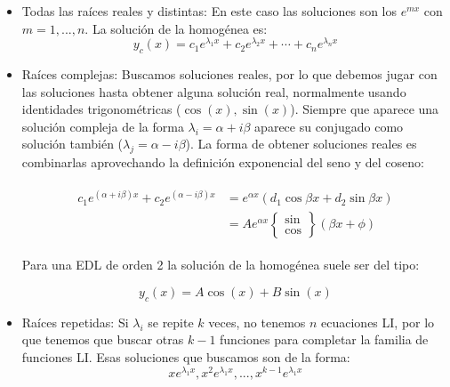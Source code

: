 \documentclass[a4paper,12pt,titlepage]{article}
\begin{document}
\begin{itemize}
    \item Todas las raíces reales y distintas: En este caso las soluciones son los $e^{mx}$ con $m=1,...,n$. La solución de la homogénea es:
    \begin{equation}
        y_c(x) = c_1e^{\lambda_1x} + c_2e^{\lambda_2 x} + \cdots + c_ne^{\lambda_nx}
    \end{equation}

    \item Raíces complejas: Buscamos soluciones reales, por lo que debemos jugar con las soluciones hasta obtener alguna solución real, normalmente usando identidades trigonométricas ($\cos(x),\sin(x)$). Siempre que aparece una solución compleja de la forma $\lambda_i = \alpha + i\beta$ aparece su conjugado como solución también ($\lambda_j=\alpha - i\beta$). La forma de obtener soluciones reales es combinarlas aprovechando la definición exponencial del seno y del coseno:

    \begin{align}
        \begin{split}
            c_1e^{(\alpha + i\beta)x} + c_2e^{(\alpha - i\beta)x} &= e^{\alpha x}(d_1 \cos{\beta x} + d_2\sin{\beta x}) \\
            &= Ae^{\alpha x} \begin{Bmatrix}
                \sin \\
                \cos
            \end{Bmatrix} (\beta x + \phi)
        \end{split}
    \end{align}

    Para una EDL de orden 2 la solución de la homogénea suele ser del tipo:

    \begin{equation}
        y_c(x) = A \cos(x) + B\sin(x)
    \end{equation}

    \item Raíces repetidas: Si $\lambda_i$ se repite $k$ veces, no tenemos $n$ ecuaciones LI, por lo que tenemos que buscar otras $k-1$ funciones para completar la familia de funciones LI. Esas soluciones que buscamos son de la forma:
    \begin{equation}
        x e^{\lambda_1 x}, x^2e^{\lambda_1x}, ... , x^{k-1}e^{\lambda_1x}
    \end{equation}

\end{itemize}
\end{document}
